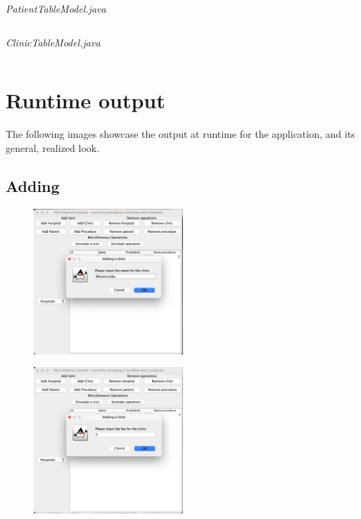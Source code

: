 \documentclass{article}
\begin{document}
\textit{PatientTableModel.java}
\inputminted{java}{./src/main/java/com/yvesstraten/medicalconsolegui/models/PatientTableModel.java}

\textit{ClinicTableModel.java}
\inputminted{java}{./src/main/java/com/yvesstraten/medicalconsolegui/models/ClinicTableModel.java}

\newpage 

\section{Runtime output}\label{sec:runtime_output} %
The following images showcase the output at runtime for the application, and its general, realized look.

\subsection{Adding}\label{sub:adding} %
\begin{figure}
  \begin{center}
    \includegraphics[width=0.5\textwidth]{./figures/Add/Clinic_1.png}
  \end{center}
\end{figure}

\begin{figure}
  \begin{center}
    \includegraphics[width=0.5\textwidth]{./figures/Add/Clinic_2.png}
  \end{center}
\end{figure}
\end{document}
